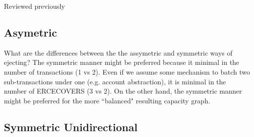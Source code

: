 \documentclass{article}
\begin{document}
Reviewed previously

\subsection*{Asymetric}

\begin{figure}[H]
    \centering
\end{figure}

What are the differences between the the assymetric and symmetric ways of ejecting? The symmetric manner might be preferred because it minimal in the number of transactions (1 vs 2). Even if we assume some mechanism to batch two sub-transactions under one (e.g. account abstraction), it is minimal in the number of ERCECOVERS (3 vs 2). On the other hand, the symmetric manner might be preferred for the more ``balanced" resulting capacity graph.

\subsection*{Symmetric Unidirectional}

\begin{figure}[H]
    \centering
\end{figure}
\end{document}
